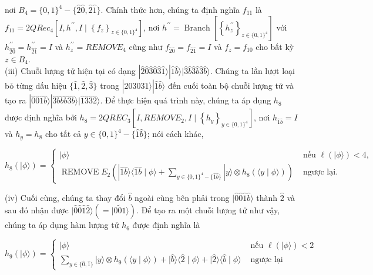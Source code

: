 \documentclass[10pt]{article}
\begin{document}
nơi $B_{4}=\{0,1\}^{4}-\{\hat{2} \hat{0}, \hat{2} \hat{1}\}$. Chính thức hơn, chúng ta định nghĩa $f_{11}$ là $f_{11}=2 Q R e c_{4}\left[I, h^{\prime \prime}, I \mid\left\{f_{z}\right\}_{z \in\{0,1\}^{4}}\right]$, nơi $h^{\prime \prime}=\operatorname{Branch}\left[\left\{h_{z}^{\prime \prime}\right\}_{z \in\{0,1\}^{4}}\right]$ với $h_{\hat{2} \hat{0}}^{\prime \prime}=h_{\hat{2} \hat{1}}^{\prime \prime}=I$ và $h_{z}^{\prime \prime}=R E M O V E_{4}$ cũng như $f_{\hat{2} \hat{0}}=f_{\hat{2} \hat{1}}=I$ và $f_{z}=f_{10}$ cho bất kỳ $z \in B_{4}$.\\
(iii) Chuỗi lượng tử hiện tại có dạng $|\hat{2} \hat{0} \hat{3} \hat{0} \hat{3} \hat{1}\rangle|\hat{1} \hat{b}\rangle|\hat{3} \hat{b} \hat{3} \hat{b} \hat{3} \hat{b}\rangle$. Chúng ta lần lượt loại bỏ từng dấu hiệu $\{\hat{1}, \hat{2}, \hat{3}\}$ trong $|\hat{2} \hat{0} \hat{3} \hat{0} \hat{3} \hat{1}\rangle|\hat{1} \hat{b}\rangle$ đến cuối toàn bộ chuỗi lượng tử và tạo ra $|\hat{0} \hat{0} \hat{1} \hat{b}\rangle|\hat{3} \hat{b} \hat{b} \hat{b} \hat{3} \hat{b}\rangle|\hat{1} \hat{3} \hat{3} \hat{2}\rangle$. Để thực hiện quá trình này, chúng ta áp dụng $h_{8}$ được định nghĩa bởi $h_{8}=2 Q R E C_{3}\left[I, R E M O V E_{2}, I \mid\left\{h_{y}\right\}_{y \in\{0,1\}^{4}}\right]$, nơi $h_{\hat{1} \hat{b}}=I$ và $h_{y}=h_{8}$ cho tất cả $y \in\{0,1\}^{4}-\{\hat{1} \hat{b}\}$; nói cách khác,

$$
h_{8}(|\phi\rangle)= \begin{cases}|\phi\rangle & \text { nếu } \ell(|\phi\rangle)<4, \\ \operatorname{REMOVE} E_{2}\left(|\hat{1} \hat{b}\rangle\langle\hat{1} \hat{b} \mid \phi\rangle+\sum_{y \in\{0,1\}^{4}-\{\hat{1} \hat{b}\}}|y\rangle \otimes h_{8}(\langle y \mid \phi\rangle)\right) & \text { ngược lại. }\end{cases}
$$

(iv) Cuối cùng, chúng ta thay đổi $\hat{b}$ ngoài cùng bên phải trong $|\hat{0} \hat{0} \hat{1} \hat{b}\rangle$ thành $\hat{2}$ và sau đó nhận được $|\hat{0} \hat{0} \hat{1} \hat{2}\rangle(=|\widetilde{001}\rangle)$. Để tạo ra một chuỗi lượng tử như vậy, chúng ta áp dụng hàm lượng tử $h_{6}$ được định nghĩa là

$$
h_{9}(|\phi\rangle)= \begin{cases}|\phi\rangle & \text { nếu } \ell(|\phi\rangle)<2 \\ \sum_{y \in\{\hat{0}, \hat{1}\}}|y\rangle \otimes h_{9}(\langle y \mid \phi\rangle)+|\hat{b}\rangle\langle\hat{2} \mid \phi\rangle+|\hat{2}\rangle\langle\hat{b} \mid \phi\rangle & \text { ngược lại }\end{cases}
$$
\end{document}
